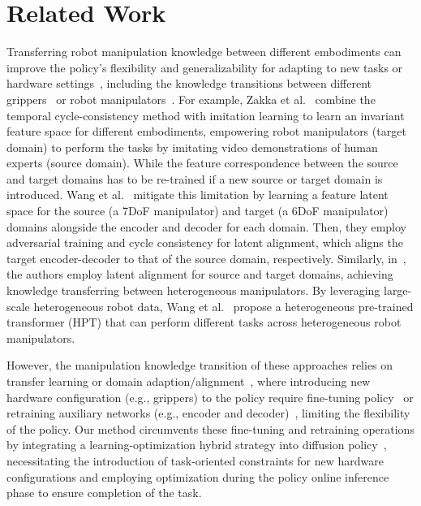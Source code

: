 \section{Related Work}
Transferring robot manipulation knowledge between different embodiments can improve the policy's flexibility and generalizability for adapting to new tasks or hardware settings~\cite{wang2024scaling}, including the knowledge transitions between different grippers~\cite{zakka2022xirl} or robot manipulators~\cite{wang2024scaling,wang2024cross,tatiya2023transferring}. For example, Zakka et al.~\cite{zakka2022xirl} combine the temporal cycle-consistency method with imitation learning to learn an invariant feature space for different embodiments, empowering robot manipulators (target domain) to perform the tasks by imitating video demonstrations of human experts (source domain). While the feature correspondence between the source and target domains has to be re-trained if a new source or target domain is introduced. Wang et al.~\cite{wang2024cross} mitigate this limitation by learning a feature latent space for the source (a 7DoF manipulator) and target (a 6DoF manipulator) domains alongside the encoder and decoder for each domain. Then, they employ adversarial training and cycle consistency for latent alignment, which aligns the target encoder-decoder to that of the source domain, respectively. Similarly, in~\cite{tatiya2023transferring}, the authors employ latent alignment for source and target domains, achieving knowledge transferring between heterogeneous manipulators. By leveraging large-scale heterogeneous robot data, Wang et al.~\cite{wang2024scaling} propose a heterogeneous pre-trained transformer (HPT) that can perform different tasks across heterogeneous robot manipulators. 

However, the manipulation knowledge transition of these approaches relies on transfer learning or domain adaption/alignment~\cite{wang2024cross,wang2024scaling,tatiya2023transferring}, where introducing new hardware configuration (e.g., grippers) to the policy require fine-tuning policy~\cite{wang2024scaling} or retraining auxiliary networks (e.g., encoder and decoder)~\cite{wang2024cross,tatiya2023transferring}, limiting the flexibility of the policy. Our method circumvents these fine-tuning and retraining operations by integrating a learning-optimization hybrid strategy into diffusion policy~\cite{chi2023diffusion}, necessitating the introduction of task-oriented constraints for new hardware configurations and employing optimization during the policy online inference phase to ensure completion of the task.

